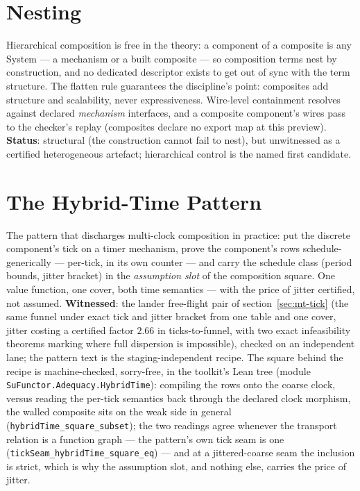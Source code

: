 \section{Nesting}
\label{sec:cp-nest}

Hierarchical composition is free in the theory: a component of a
composite is any System --- a mechanism or a built composite --- so
composition terms nest by construction, and no dedicated descriptor
exists to get out of sync with the term structure. The flatten rule
guarantees the discipline's point: composites add structure and
scalability, never expressiveness. Wire-level containment resolves
against declared \emph{mechanism} interfaces, and a composite
component's wires pass to the checker's replay (composites declare no
export map at this preview). \textbf{Status}: structural (the
construction cannot fail to nest), but unwitnessed as a certified
heterogeneous artefact; hierarchical control is the named first
candidate.



\section{The Hybrid-Time Pattern}
\label{sec:cp-hybtime}

The pattern that discharges multi-clock composition in practice: put
the discrete component's tick on a timer mechanism, prove the
component's rows schedule-generically --- per-tick, in its own counter
--- and carry the schedule class (period bounds, jitter bracket) in
the \emph{assumption slot} of the composition square. One value
function, one cover, both time semantics --- with the price of jitter
certified, not assumed. \textbf{Witnessed}: the lander free-flight
pair of section~\ref{sec:mt-tick} (the same funnel under exact tick
and jitter bracket from one table and one cover, jitter costing a
certified factor $2.66$ in ticks-to-funnel, with two exact infeasibility
theorems marking where full dispersion is impossible), checked on an
independent lane; the pattern text is the staging-independent recipe.
The square behind the recipe is machine-checked, sorry-free, in the
toolkit's Lean tree (module \texttt{SuFunctor.Adequacy.HybridTime}):
compiling the rows onto the coarse clock, versus reading the per-tick
semantics back through the declared clock morphism, the walled
composite sits on the weak side in general
(\texttt{hybridTime\_square\_subset}); the two readings agree whenever
the transport relation is a function graph --- the pattern's own tick
seam is one (\texttt{tickSeam\_hybridTime\_square\_eq}) --- and at a
jittered-coarse seam the inclusion is strict, which is why the
assumption slot, and nothing else, carries the price of jitter.

